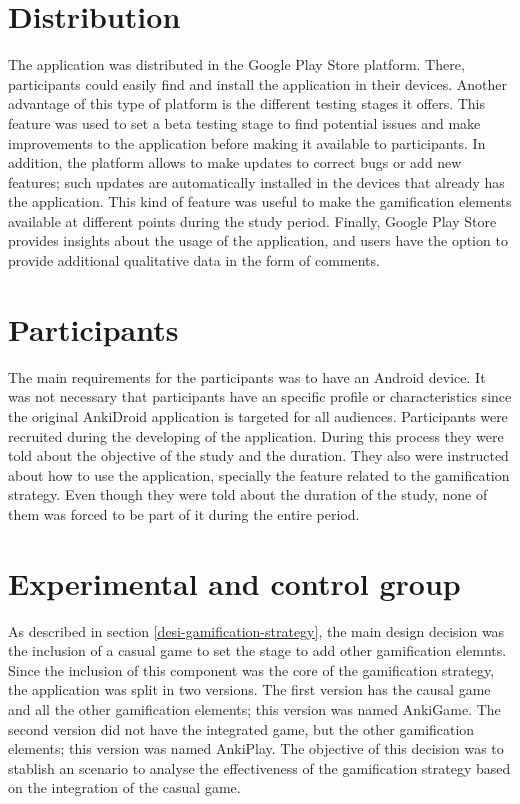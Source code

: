 \section{Distribution}
The application was distributed in the Google Play Store platform. There, participants could easily find and install the application in their devices. Another advantage of this type of platform is the different testing stages it offers. This feature was used to set a beta testing stage to find potential issues and make improvements to the application before making it available to participants. In addition, the platform allows to make updates to correct bugs or add new features; such updates are automatically installed in the devices that already has the application. This kind of feature was useful to make the gamification elements available at different points during the study period. Finally, Google Play Store provides insights about the usage of the application, and users have the option to provide additional qualitative data in the form of comments.

\section{Participants}
The main requirements for the participants was to have an Android device. It was not necessary that participants have an specific profile or characteristics since the original AnkiDroid application is targeted for all audiences. Participants were recruited during the developing of the application. During this process they were told about the objective of the study and the duration. They also were instructed about how to use the application, specially the feature related to the gamification strategy. Even though they were told about the duration of the study, none of them was forced to be part of it during the entire period.

\section{Experimental and control group}
As described in section \ref{desi-gamification-strategy}, the main design decision was the inclusion of a casual game to set the stage to add other gamification elemnts. Since the inclusion of this component was the core of the gamification strategy, the application was split in two versions. The first version has the causal game and all the other gamification elements; this version was named AnkiGame. The second version did not have the integrated game, but the other gamification elements; this version was named AnkiPlay. The objective of this decision was to stablish an scenario to analyse the effectiveness of the gamification strategy based on the integration of the casual game.


